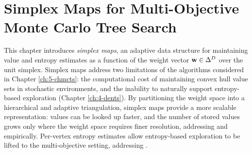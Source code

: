 
























\chapter{\label{ch:6-simplexmaps}Simplex Maps for Multi-Objective Monte Carlo Tree Search}

\minitoc

    This chapter introduces \textit{simplex maps}, an adaptive data structure for maintaining value and entropy estimates as a function of the weight vector $\mathbf{w}\in\Delta^D$ over the unit simplex. Simplex maps address two limitations of the algorithms considered in Chapter \ref{ch:5-chmcts}: the computational cost of maintaining convex hull value sets in stochastic environments, and the inability to naturally support entropy-based exploration (Chapter \ref{ch:4-dents}). By partitioning the weight space into a hierarchical and adaptive triangulation, simplex maps provide a more scalable representation: values can be looked up faster, and the number of stored values grows only where the weight space requires finer resolution, addressing \moscalabilityq\ewe and \stochq\ewe empirically.
    Per-vertex entropy estimates allow entropy-based 
    exploration to be lifted to the multi-objective setting, addressing \contextq.


